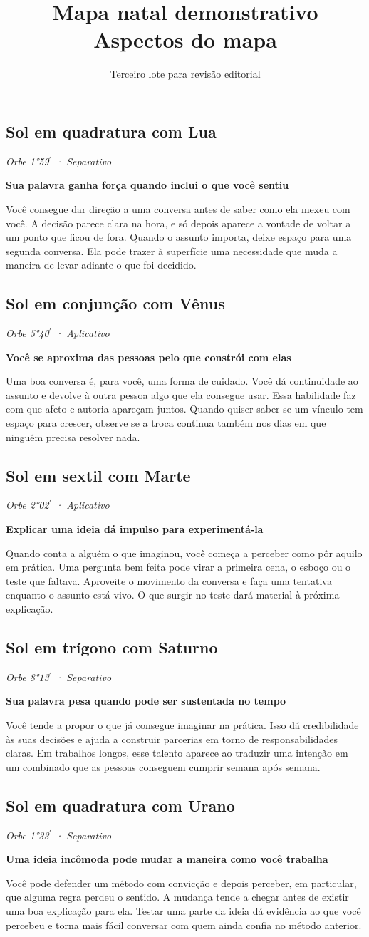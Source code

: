 \documentclass[11pt,a4paper]{article}
\title{Mapa natal demonstrativo\\Aspectos do mapa}
\author{Terceiro lote para revisão editorial}
\date{}
\newcommand{\leitura}[3]{\subsection{#1}\textit{#2}\par #3}
\newcommand{\subtituloleitura}[1]{\textbf{#1}\par\nopagebreak[4]}
\begin{document}
\maketitle
\leitura{Sol em quadratura com Lua}{Orbe 1°59\ensuremath{^{\prime}} · Separativo}{
\subtituloleitura{Sua palavra ganha força quando inclui o que você sentiu}
Você consegue dar direção a uma conversa antes de saber como ela mexeu com você. A decisão parece clara na hora, e só depois aparece a vontade de voltar a um ponto que ficou de fora. Quando o assunto importa, deixe espaço para uma segunda conversa. Ela pode trazer à superfície uma necessidade que muda a maneira de levar adiante o que foi decidido.
}

\leitura{Sol em conjunção com Vênus}{Orbe 5°40\ensuremath{^{\prime}} · Aplicativo}{
\subtituloleitura{Você se aproxima das pessoas pelo que constrói com elas}
Uma boa conversa é, para você, uma forma de cuidado. Você dá continuidade ao assunto e devolve à outra pessoa algo que ela consegue usar. Essa habilidade faz com que afeto e autoria apareçam juntos. Quando quiser saber se um vínculo tem espaço para crescer, observe se a troca continua também nos dias em que ninguém precisa resolver nada.
}

\leitura{Sol em sextil com Marte}{Orbe 2°02\ensuremath{^{\prime}} · Aplicativo}{
\subtituloleitura{Explicar uma ideia dá impulso para experimentá-la}
Quando conta a alguém o que imaginou, você começa a perceber como pôr aquilo em prática. Uma pergunta bem feita pode virar a primeira cena, o esboço ou o teste que faltava. Aproveite o movimento da conversa e faça uma tentativa enquanto o assunto está vivo. O que surgir no teste dará material à próxima explicação.
}

\leitura{Sol em trígono com Saturno}{Orbe 8°13\ensuremath{^{\prime}} · Separativo}{
\subtituloleitura{Sua palavra pesa quando pode ser sustentada no tempo}
Você tende a propor o que já consegue imaginar na prática. Isso dá credibilidade às suas decisões e ajuda a construir parcerias em torno de responsabilidades claras. Em trabalhos longos, esse talento aparece ao traduzir uma intenção em um combinado que as pessoas conseguem cumprir semana após semana.
}

\leitura{Sol em quadratura com Urano}{Orbe 1°33\ensuremath{^{\prime}} · Separativo}{
\subtituloleitura{Uma ideia incômoda pode mudar a maneira como você trabalha}
Você pode defender um método com convicção e depois perceber, em particular, que alguma regra perdeu o sentido. A mudança tende a chegar antes de existir uma boa explicação para ela. Testar uma parte da ideia dá evidência ao que você percebeu e torna mais fácil conversar com quem ainda confia no método anterior.
}
\end{document}
